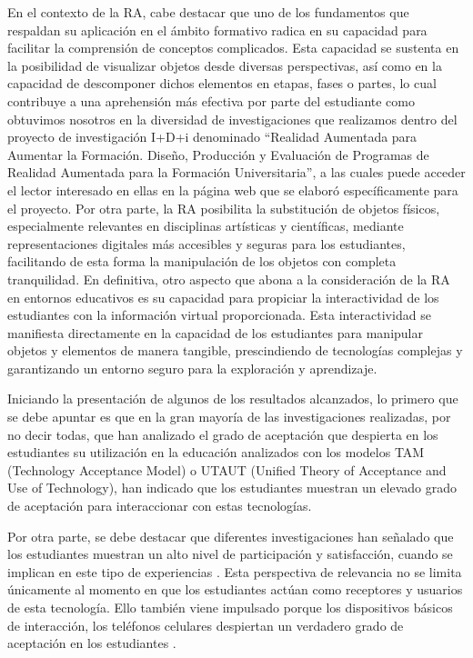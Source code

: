 \documentclass[spanish]{textolivre}
\begin{document}
En el contexto de la RA, cabe destacar que uno de los fundamentos que respaldan su aplicación en el ámbito formativo radica en su capacidad para facilitar la comprensión de conceptos complicados. Esta capacidad se sustenta en la posibilidad de visualizar objetos desde diversas perspectivas, así como en la capacidad de descomponer dichos elementos en etapas, fases o partes, lo cual contribuye a una aprehensión más efectiva por parte del estudiante como obtuvimos nosotros en la diversidad de investigaciones que realizamos dentro del proyecto de investigación I+D+i denominado “Realidad Aumentada para Aumentar la Formación. Diseño, Producción y Evaluación de Programas de Realidad Aumentada para la Formación Universitaria”, a las cuales puede acceder el lector interesado en ellas en la página web que se elaboró específicamente para el proyecto. Por otra parte, la RA posibilita la substitución de objetos físicos, especialmente relevantes en disciplinas artísticas y científicas, mediante representaciones digitales más accesibles y seguras para los estudiantes, facilitando de esta forma la manipulación de los objetos con completa tranquilidad. En definitiva, otro aspecto que abona a la consideración de la RA en entornos educativos es su capacidad para propiciar la interactividad de los estudiantes con la información virtual proporcionada. Esta interactividad se manifiesta directamente en la capacidad de los estudiantes para manipular objetos y elementos de manera tangible, prescindiendo de tecnologías complejas y garantizando un entorno seguro para la exploración y aprendizaje.

Iniciando la presentación de algunos de los resultados alcanzados, lo primero que se debe apuntar es que en la gran mayoría de las investigaciones realizadas, por no decir todas, que han analizado el grado de aceptación que despierta en los estudiantes su utilización en la educación analizados con los modelos TAM (Technology Acceptance Model) o UTAUT (Unified Theory of Acceptance and Use of Technology), han indicado que los estudiantes muestran un elevado grado de aceptación para interaccionar con estas tecnologías.

Por otra parte, se debe destacar que diferentes investigaciones han señalado que los estudiantes muestran un alto nivel de participación y satisfacción, cuando se implican en este tipo de experiencias \cite{cabero_2018,cabero2020use}. Esta perspectiva de relevancia no se limita únicamente al momento en que los estudiantes actúan como receptores y usuarios de esta tecnología. Ello también viene impulsado porque los dispositivos básicos de interacción, los teléfonos celulares despiertan un verdadero grado de aceptación en los estudiantes \cite{lopezpadron2024uso}.
\end{document}
